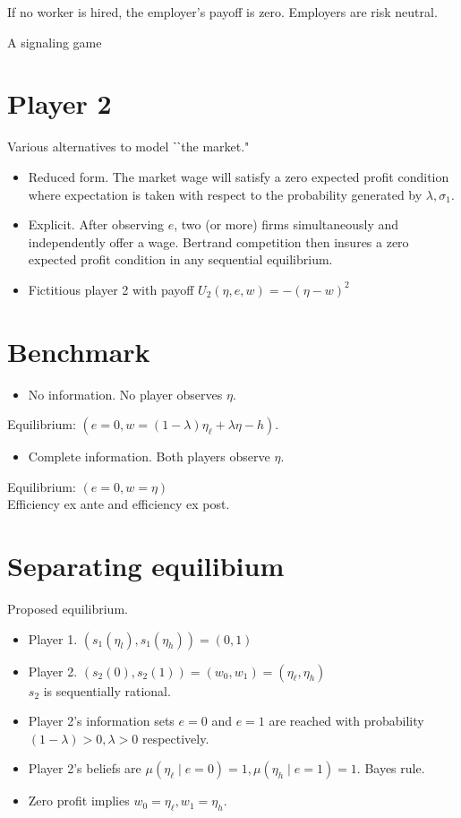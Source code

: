 \documentclass[10pt]{article}
\begin{document}
If no worker is hired, the employer's payoff is zero. Employers are risk neutral.

A signaling game

\section*{Player 2}
Various alternatives to model ˋˋthe market."

\begin{itemize}
  \item Reduced form. The market wage will satisfy a zero expected profit condition where expectation is taken with respect to the probability generated by $\lambda, \sigma_{1}$.
  \item Explicit. After observing $e$, two (or more) firms simultaneously and independently offer a wage. Bertrand competition then insures a zero expected profit condition in any sequential equilibrium.
  \item Fictitious player 2 with payoff $U_{2}(\eta, e, w)=-(\eta-w)^{2}$
\end{itemize}

\section*{Benchmark}
\begin{itemize}
  \item No information. No player observes $\eta$.
\end{itemize}

Equilibrium: $\left(e=0, w=(1-\lambda) \eta_{\ell}+\lambda \eta-h\right)$.

\begin{itemize}
  \item Complete information. Both players observe $\eta$.
\end{itemize}

Equilibrium: $(e=0, w=\eta)$\\
Efficiency ex ante and efficiency ex post.

\section*{Separating equilibium}
Proposed equilibrium.

\begin{itemize}
  \item Player 1. $\left(s_{1}\left(\eta_{l}\right), s_{1}\left(\eta_{h}\right)\right)=(0,1)$
  \item Player 2. $\left(s_{2}(0), s_{2}(1)\right)=\left(w_{0}, w_{1}\right)=\left(\eta_{\ell}, \eta_{h}\right)$\\
$s_{2}$ is sequentially rational.
  \item Player 2's information sets $e=0$ and $e=1$ are reached with probability $(1-\lambda)>0, \lambda>0$ respectively.
  \item Player 2's beliefs are $\mu\left(\eta_{\ell} \mid e=0\right)=1, \mu\left(\eta_{h} \mid e=1\right)=1$. Bayes rule.
  \item Zero profit implies $w_{0}=\eta_{\ell}, w_{1}=\eta_{h}$.
\end{itemize}
\end{document}
